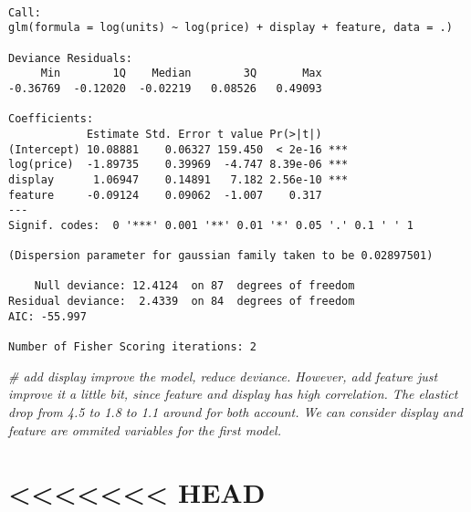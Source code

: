 \documentclass[]{article}
\newenvironment{Shaded}{\begin{snugshade}}{\end{snugshade}}
\newcommand{\CommentTok}[1]{\textcolor[rgb]{0.56,0.35,0.01}{\textit{#1}}}
\newcommand{\DataTypeTok}[1]{\textcolor[rgb]{0.13,0.29,0.53}{#1}}
\newcommand{\KeywordTok}[1]{\textcolor[rgb]{0.13,0.29,0.53}{\textbf{#1}}}
\newcommand{\NormalTok}[1]{#1}
\newcommand{\OperatorTok}[1]{\textcolor[rgb]{0.81,0.36,0.00}{\textbf{#1}}}
\newcommand{\StringTok}[1]{\textcolor[rgb]{0.31,0.60,0.02}{#1}}
\begin{document}
\begin{Shaded}
\end{Shaded}

\begin{verbatim}

Call:
glm(formula = log(units) ~ log(price) + display + feature, data = .)

Deviance Residuals: 
     Min        1Q    Median        3Q       Max  
-0.36769  -0.12020  -0.02219   0.08526   0.49093  

Coefficients:
            Estimate Std. Error t value Pr(>|t|)    
(Intercept) 10.08881    0.06327 159.450  < 2e-16 ***
log(price)  -1.89735    0.39969  -4.747 8.39e-06 ***
display      1.06947    0.14891   7.182 2.56e-10 ***
feature     -0.09124    0.09062  -1.007    0.317    
---
Signif. codes:  0 '***' 0.001 '**' 0.01 '*' 0.05 '.' 0.1 ' ' 1

(Dispersion parameter for gaussian family taken to be 0.02897501)

    Null deviance: 12.4124  on 87  degrees of freedom
Residual deviance:  2.4339  on 84  degrees of freedom
AIC: -55.997

Number of Fisher Scoring iterations: 2
\end{verbatim}

\begin{Shaded}
\begin{Highlighting}[]
\CommentTok{# add display improve the model, reduce deviance. However, add feature just improve it a little bit, since feature and display has high correlation. The elastict drop from 4.5 to 1.8 to 1.1 around for both account. We can consider display and feature are ommited variables for the first model.}
\end{Highlighting}
\end{Shaded}

\hypertarget{head-1}{%
\section{\textless{}\textless{}\textless{}\textless{}\textless{}\textless{}\textless{}
HEAD}\label{head-1}}
\end{document}

